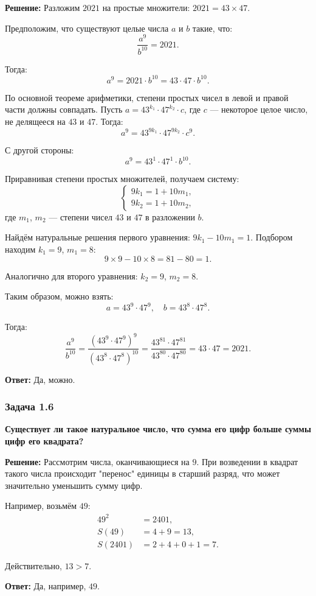 \documentclass[12pt, a4paper]{article}
\begin{document}
\textbf{Решение:}
Разложим $2021$ на простые множители: $2021 = 43 \times 47$.

Предположим, что существуют целые числа $a$ и $b$ такие, что:
\[
\frac{a^9}{b^{10}} = 2021.
\]

Тогда:
\[
a^9 = 2021 \cdot b^{10} = 43 \cdot 47 \cdot b^{10}.
\]

По основной теореме арифметики, степени простых чисел в левой и правой части должны совпадать. Пусть $a = 43^{k_1} \cdot 47^{k_2} \cdot c$, где $c$ — некоторое целое число, не делящееся на $43$ и $47$. Тогда:
\[
a^9 = 43^{9k_1} \cdot 47^{9k_2} \cdot c^9.
\]

С другой стороны:
\[
a^9 = 43^1 \cdot 47^1 \cdot b^{10}.
\]

Приравнивая степени простых множителей, получаем систему:
\[
\begin{cases}
9k_1 = 1 + 10m_1, \\
9k_2 = 1 + 10m_2,
\end{cases}
\]
где $m_1$, $m_2$ — степени чисел $43$ и $47$ в разложении $b$.

Найдём натуральные решения первого уравнения: $9k_1 - 10m_1 = 1$. Подбором находим $k_1 = 9$, $m_1 = 8$:
\[
9 \times 9 - 10 \times 8 = 81 - 80 = 1.
\]

Аналогично для второго уравнения: $k_2 = 9$, $m_2 = 8$.

Таким образом, можно взять:
\[
a = 43^9 \cdot 47^9,\quad b = 43^8 \cdot 47^8.
\]

Тогда:
\[
\frac{a^9}{b^{10}} = \frac{(43^9 \cdot 47^9)^9}{(43^8 \cdot 47^8)^{10}} = \frac{43^{81} \cdot 47^{81}}{43^{80} \cdot 47^{80}} = 43 \cdot 47 = 2021.
\]

\textbf{Ответ:} Да, можно.

\subsubsection*{Задача 1.6}
\textbf{Существует ли такое натуральное число, что сумма его цифр больше суммы цифр его квадрата?}

\textbf{Решение:}
Рассмотрим числа, оканчивающиеся на $9$. При возведении в квадрат такого числа происходит "перенос" единицы в старший разряд, что может значительно уменьшить сумму цифр.

Например, возьмём $49$:
\begin{align*}
49^2 &= 2401, \\
S(49) &= 4 + 9 = 13, \\
S(2401) &= 2 + 4 + 0 + 1 = 7.
\end{align*}

Действительно, $13 > 7$.

\textbf{Ответ:} Да, например, $49$.
\end{document}
